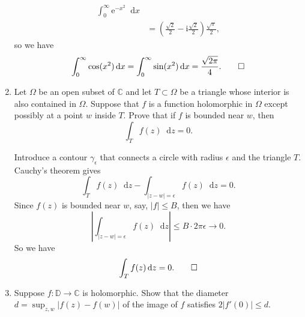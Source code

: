 \documentclass[11pt]{report}
\theoremstyle{mythm}
\let\oldendproof\endproof
\renewenvironment{proof}[1][\proofname]{%
  \oldproof[\normalfont \bfseries #1]%
}{\oldendproof}
\renewcommand*{\proofname}{Proof}
\theoremstyle{myans}
\newcommand{\mi}{\mathrm{i}}
\newcommand{\me}{\mathrm{e}}
\newcommand{\dd}{\mathop{}\!\mathrm{d}}
\newcommand{\bbC}{\mathbb{C}}
\newcommand{\bbD}{\mathbb{D}}
\begin{document}
\begin{enumerate}
\begin{proof}
\begin{align*}
      \int_0^\infty \me^{-x^2}\dd x\\
      &= \left(\frac{\sqrt 2} 2 - \mi\frac{\sqrt{2}}2 \right) \frac{\sqrt \pi}2,
    \end{align*}
    so we have
    \[ \int_0^\infty \cos(x^2) \dd x = \int_0^\infty \sin(x^2) \dd x = \frac{\sqrt{2\pi}}{4}. \qedhere \]
  \end{proof}
  \setcounter{enumi}{5}
  \item Let $\Omega$ be an open subset of $\bbC$ and let $T\subset \Omega$ be a triangle whose interior is also
  contained in $\Omega$. Suppose that $f$ is a function holomorphic in $\Omega$ except possibly at
  a point $w$ inside $T$. Prove that if $f$ is bounded near $w$, then
  \[ \int_T f(z) \dd z = 0. \]
  \begin{proof}
    Introduce a contour $\gamma_\epsilon$ that connects a circle with radius $\epsilon$ and
    the triangle $T$. Cauchy's theorem gives
    \[ \int_T f(z)\dd z - \int_{|z-w| = \epsilon} f(z)\dd z = 0. \]
    Since $f(z)$ is bounded near $w$, say, $|f|\leq B$, then we have
    \[ \left| \int_{|z-w|=\epsilon} f(z) \dd z \right| \leq B \cdot 2\pi \epsilon \to 0. \]
    So we have
    \[ \int_T f(z) \dd z = 0. \qedhere \]
  \end{proof}
  \item Suppose $f\colon \bbD \to \bbC$ is holomorphic. Show that the diameter $d=\sup_{z,w}|f(z)-f(w)|$
  of the image of $f$ satisfies $2|f'(0)|\leq d$.


\end{enumerate}
\end{document}
